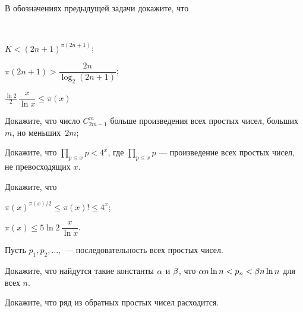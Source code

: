 \documentclass[a4paper,12pt]{article}
\begin{document}
В обозначениях предыдущей задачи докажите, что

\\


$K<(2n+1)^{\pi(2n+1)}$;


$\pi(2n+1) > \dfrac{2n}{\log_2(2n+1)}$;


$\frac{\ln2}{2}\, \dfrac{x}{\ln x} \le \pi(x)$







Докажите, что число $C_{2m-1}^m$ больше произведения всех простых чисел, больших $m$, но меньших~$2m$;

\medskip


Докажите, что $\displaystyle \prod\limits_{p\le x} p < 4^x$, где $\displaystyle \prod\limits_{p\le x} p$ --- произведение всех простых чисел, не превосходящих $x$.





Докажите, что



\medskip


$\pi(x)^{\pi(x)/2} \le \pi(x)! \le 4^x$;


$\pi(x) \le 5\ln2\, \dfrac{x}{\ln x}$.





Пусть $p_1, p_2,\ldots,$ --- последовательность всех простых чисел.

Докажите, что найдутся такие константы $\alpha$ и $\beta$, что $\alpha n \ln n < p_n < \beta n \ln n$ для всех $n$.





Докажите, что ряд из обратных простых чисел расходится.








\end{document}
